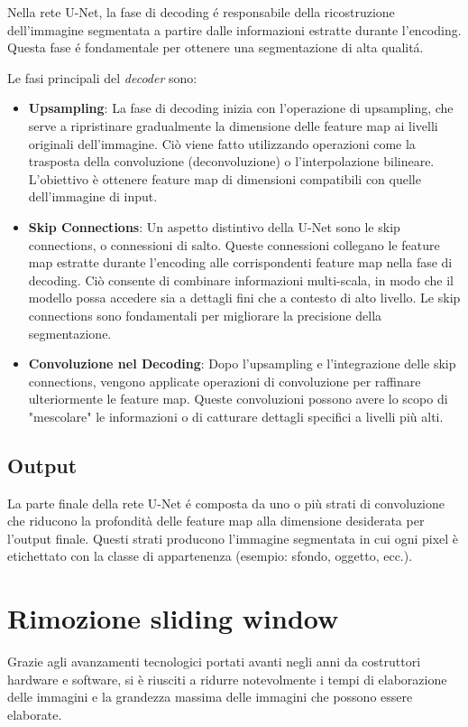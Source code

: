 Nella rete U-Net, la fase di decoding \'e responsabile della ricostruzione dell'immagine segmentata a partire dalle informazioni estratte durante l'encoding. Questa fase \'e fondamentale per ottenere una segmentazione di alta qualit\'a.

Le fasi principali del \textit{decoder} sono:
\begin{itemize}
  \item \textbf{Upsampling}: La fase di decoding inizia con l'operazione di upsampling, che serve a ripristinare gradualmente la dimensione delle feature map ai livelli originali dell'immagine. Ciò viene fatto utilizzando operazioni come la trasposta della convoluzione (deconvoluzione) o l'interpolazione bilineare. L'obiettivo è ottenere feature map di dimensioni compatibili con quelle dell'immagine di input.
  \item \textbf{Skip Connections}: Un aspetto distintivo della U-Net sono le skip connections, o connessioni di salto. Queste connessioni collegano le feature map estratte durante l'encoding alle corrispondenti feature map nella fase di decoding. Ciò consente di combinare informazioni multi-scala, in modo che il modello possa accedere sia a dettagli fini che a contesto di alto livello. Le skip connections sono fondamentali per migliorare la precisione della segmentazione.
  \item \textbf{Convoluzione nel Decoding}: Dopo l'upsampling e l'integrazione delle skip connections, vengono applicate operazioni di convoluzione per raffinare ulteriormente le feature map. Queste convoluzioni possono avere lo scopo di "mescolare" le informazioni o di catturare dettagli specifici a livelli più alti.
\end{itemize}


\subsection{Output} %
\label{sec:Output}
La parte finale della rete U-Net \'e composta da uno o più strati di convoluzione che riducono la profondità delle feature map alla dimensione desiderata per l'output finale. Questi strati producono l'immagine segmentata in cui ogni pixel è etichettato con la classe di appartenenza (esempio: sfondo, oggetto, ecc.).


\section{Rimozione sliding window} %
\label{sub:Rimozione sliding window}
Grazie agli avanzamenti tecnologici portati avanti negli anni da costruttori hardware e software, si è riusciti a ridurre notevolmente i tempi di elaborazione delle immagini e la grandezza massima delle immagini che possono essere elaborate.

